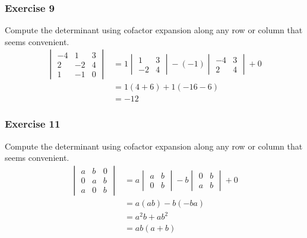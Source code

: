 \documentclass{math}
\begin{document}
\subsubsection*{Exercise 9}
Compute the determinant using cofactor expansion along any row or column that
seems convenient.
\begin{align*}
  \begin{vmatrix}
    -4 & 1 & 3 \\
    2 & -2 & 4 \\
    1 & -1 & 0
  \end{vmatrix} &= 1\begin{vmatrix}1 & 3 \\ -2 & 4\end{vmatrix}-
    (-1)\begin{vmatrix}-4 & 3 \\ 2 & 4\end{vmatrix}+0 \\
  &= 1(4+6)+1(-16-6) \\
  &= -12
\end{align*}

\subsubsection*{Exercise 11}
Compute the determinant using cofactor expansion along any row or column that
seems convenient.
\begin{align*}
  \begin{vmatrix}
    a & b & 0 \\
    0 & a & b \\
    a & 0 & b
  \end{vmatrix} &= a\begin{vmatrix}a & b \\ 0 & b\end{vmatrix}-
    b\begin{vmatrix}0 & b \\ a & b\end{vmatrix}+0 \\
  &= a(ab)-b(-ba) \\
  &= a^2b+ab^2 \\
  &= ab(a+b)
\end{align*}
\end{document}
